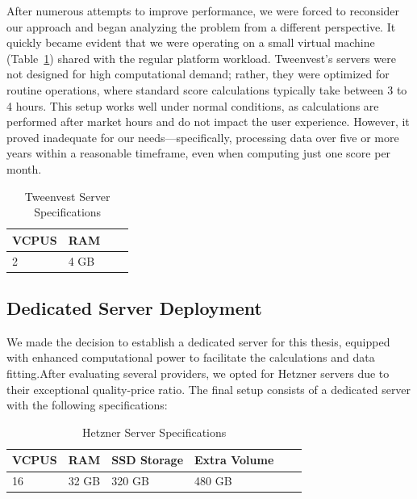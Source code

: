 \documentclass[11pt,english,a4paper,hidelinks]{book}
\begin{document}
\vspace{0.5cm}
\noindent After numerous attempts to improve performance, we were forced to reconsider our approach and began analyzing the problem from a different perspective. It quickly became evident that we were operating on a small virtual machine (Table~\ref{tab:tweenvest_server_specs}) shared with the regular platform workload. Tweenvest's servers were not designed for high computational demand; rather, they were optimized for routine operations, where standard score calculations typically take between 3 to 4 hours. This setup works well under normal conditions, as calculations are performed after market hours and do not impact the user experience. However, it proved inadequate for our needs—specifically, processing data over five or more years within a reasonable timeframe, even when computing just one score per month.

\begin{table}[H]
    \centering
    \caption{Tweenvest Server Specifications}
    \begin{tabular}{|l|l|l|l|}
        \hline
        \textbf{VCPUS} & \textbf{RAM}  \\
        \hline
        2 & 4 GB  \\
        \hline
    \end{tabular}
    \label{tab:tweenvest_server_specs}
\end{table}


\subsection{Dedicated Server Deployment}
\noindent We made the decision to establish a dedicated server for this thesis, equipped with enhanced computational power to facilitate the calculations and data fitting.After evaluating several providers, we opted for Hetzner servers due to their exceptional quality-price ratio. The final setup consists of a dedicated server with the following specifications:

\begin{table}[H]
    \centering
    \caption{Hetzner Server Specifications}
    \begin{tabular}{|l|l|l|l|l|l|}
        \hline
        \textbf{VCPUS} & \textbf{RAM} & \textbf{SSD Storage} & \textbf{Extra Volume} \\
        \hline
        16 & 32 GB & 320 GB & 480 GB \\
        \hline
    \end{tabular}
    \label{tab:hetzner_server_specs}
\end{table}
\end{document}
